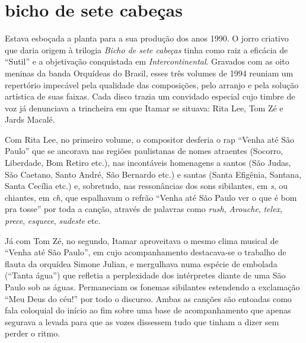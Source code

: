 \section{bicho de sete cabeças}

Estava esboçada a planta para a sua produção dos anos 1990. O jorro
criativo que daria origem à trilogia \textit{Bicho de sete cabeças} tinha como raiz
a eficácia de ``Sutil'' e a objetivação conquistada em \textit{Intercontinental}.
Gravados com as oito meninas da banda Orquídeas do Brasil, esses três
volumes de 1994 reuniam um repertório impecável pela qualidade das
composições, pelo arranjo e pela solução artística de suas faixas. Cada
disco trazia um convidado especial cujo timbre de voz já denunciava a
trincheira em que Itamar se situava: Rita Lee, Tom Zé e Jards Macalé.

Com Rita Lee, no primeiro volume, o compositor desferia o rap ``Venha até
São Paulo'' que se ancorava nas regiões paulistanas de nomes atraentes (Socorro, Liberdade, Bom Retiro etc.), nas incontáveis homenagens a
santos (São Judas, São Caetano, Santo André, São Bernardo etc.) e santas
(Santa Efigênia, Santana, Santa Cecília etc.) e, sobretudo, nas
ressonâncias dos sons sibilantes, em \textit{s}, ou chiantes, em \textit{ch}, que
espalhavam o refrão ``Venha até São Paulo ver o que é bom pra tosse''
por toda a canção, através de palavras como \textit{rush}, \textit{Arouche},
\textit{telex}, \textit{prece}, \textit{esquece}, \textit{sudeste} etc.

Já com Tom Zé, no segundo, Itamar aproveitava o mesmo clima musical de
``Venha até São Paulo'', em cujo acompanhamento destacava-se o trabalho de
flauta da orquídea Simone Julian, e mergulhava numa espécie de embolada
(``Tanta água'') que refletia a perplexidade dos intérpretes diante de uma
São Paulo sob as águas. Permaneciam os fonemas sibilantes estendendo a
exclamação ``Meu Deus do céu!'' por todo o discurso. Ambas as canções
são entoadas como fala coloquial do início ao fim sobre uma base de
acompanhamento que apenas segurava a levada para que as vozes dissessem
tudo que tinham a dizer sem perder o ritmo.

